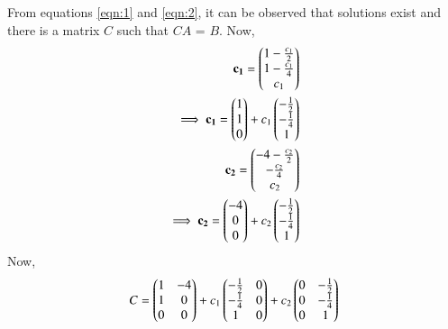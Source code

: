 \documentclass[journal,12pt,twocolumn]{IEEEtran}
\begin{document}
From equations \ref{eqn:1} and \ref{eqn:2}, it can be observed that solutions exist and there is a matrix $C$ such that $CA$ = $B$.
Now,
\begin{align}
\mathbf{c_1} = \begin{pmatrix}1- \frac{c_1}{2}\\1-\frac{c_1}{4}\\c_1\end{pmatrix}\\
\implies \mathbf{c_1} = \begin{pmatrix}1\\1\\0\end{pmatrix} + c_1\begin{pmatrix}-\frac{1}{2}\\-\frac{1}{4}\\1\end{pmatrix}\\
\mathbf{c_2} = \begin{pmatrix}-4- \frac{c_2}{2}\\-\frac{c_2}{4}\\c_2\end{pmatrix}\\
\implies \mathbf{c_2} = \begin{pmatrix}-4\\0\\0\end{pmatrix} + c_2\begin{pmatrix}-\frac{1}{2}\\-\frac{1}{4}\\1\end{pmatrix}
\end{align}
Now,
\begin{align}
C = \begin{pmatrix}1 & -4\\1 & 0\\0 & 0\end{pmatrix}+c_1\begin{pmatrix}-\frac{1}{2} & 0\\-\frac{1}{4} & 0\\1 & 0\end{pmatrix} + c_2\begin{pmatrix}0 & -\frac{1}{2}\\0 & -\frac{1}{4}\\0 & 1\end{pmatrix}
\end{align}
\end{document}
